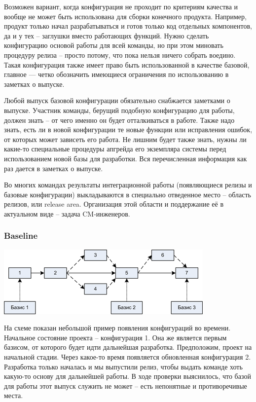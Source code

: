 \documentclass{../industrial-development}
\begin{document}
Возможен вариант, когда конфигурация не проходит по критериям качества и вообще не может быть использована для сборки конечного продукта. Например, продукт только начал разрабатываться и готов только код отдельных компонентов, да и у тех – заглушки вместо работающих функций. Нужно сделать конфигурацию основой работы для всей команды, но при этом миновать процедуру релиза – просто потому, что пока нельзя ничего собрать воедино. Такая конфигурация также имеет право быть использованной в качестве базовой, главное — четко обозначить имеющиеся ограничения по использованию в заметках о выпуске.

Любой выпуск базовой конфигурации обязательно снабжается заметками о выпуске. Участник команды, берущий подобную конфигурацию для работы, должен знать – от чего именно он будет отталкиваться в работе. Также надо знать, есть ли в новой конфигурации те новые функции или исправления ошибок, от которых может зависеть его работа. Не лишним будет также знать, нужны ли какие-то специальные процедуры апгрейда его экземпляра системы перед использованием новой базы для разработки. Вся перечисленная информация как раз дается в заметках о выпуске.

Во многих командах результаты интеграционной работы (появляющиеся релизы и базовые конфигурации) выкладываются в специально отведенное место – область релизов, или release area. Организация этой области и поддержание её в актуальном виде – задача CM-инженеров.
~\cite{Configurations}

	
\begin{frame} \frametitle{Baseline}
 \includegraphics[width=\textwidth]{baseline}

\end{frame}

\lecturenotes

На схеме показан небольшой пример появления конфигураций во времени. Начальное состояние проекта – конфигурация 1. Она же является первым базисом, от которого будет идти дальнейшая разработка. Предположим, проект на начальной стадии. Через какое-то время появляется обновленная конфигурация 2. Разработка только началась и мы выпустили релиз, чтобы выдать команде хоть какую-то основу для дальнейшей работы. В ходе проверки выяснилось, что базой для работы этот выпуск служить не может – есть непонятные и противоречивые места.
\end{document}
